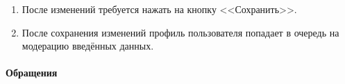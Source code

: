 \documentclass{../includes/TechDoc}
\begin{document}
\begin{enumerate}
        \item После изменений требуется нажать на кнопку <<Сохранить>>.
        \item После сохранения изменений профиль пользователя попадает в очередь на модерацию введённых данных.

    \end{enumerate}

    \clearpage

    \paragraph{Обращения}

    \begin{figure}[ht]
        \begin{center}
            \begin{minipage}[h]{0.32\linewidth}

\end{minipage}
\end{center}
\end{figure}
\end{document}
